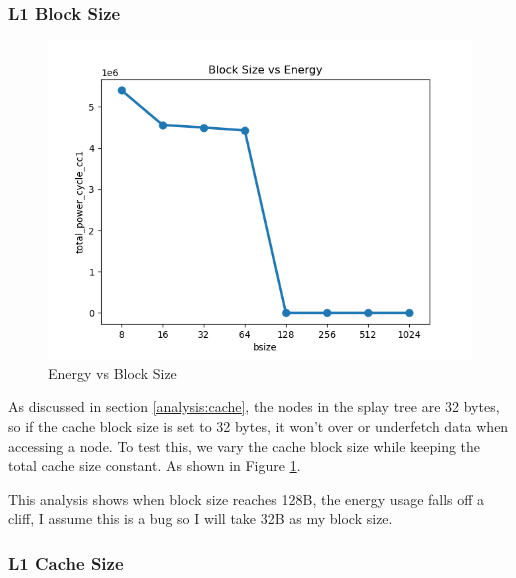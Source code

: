 \documentclass{article}
\begin{document}
\begin{multicols}{2}
  \subsubsection{L1 Block Size}
  \begin{figure}[H]
    \centering
    \includegraphics[width=\linewidth]{./assets/l1bsize_vs_energy.png}
    \caption{Energy vs Block Size}
    \label{fig:bsize_vs_energy}
  \end{figure}
  As discussed in section \ref{analysis:cache}, the nodes in the splay tree are 32 bytes, so if the cache block size is set to 32 bytes, it won't over or underfetch data when accessing a node. To test this, we vary the cache block size while keeping the total cache size constant. As shown in Figure \ref{fig:bsize_vs_energy}.


  This analysis shows when block size reaches 128B, the energy usage falls off a cliff, I assume this is a bug so I will take 32B as my block size.

  \subsubsection{L1 Cache Size}


\end{multicols}
\end{document}
